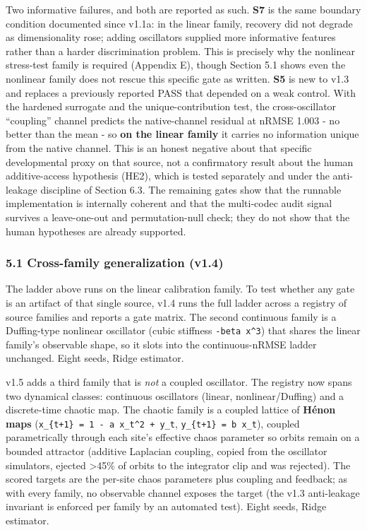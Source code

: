 \documentclass[
  11pt,
]{article}
\begin{document}
Two informative failures, and both are reported
as such. \textbf{S7} is the same boundary
condition documented since v1.1a: in the linear
family, recovery did not degrade as
dimensionality rose; adding oscillators supplied
more informative features rather than a harder
discrimination problem. This is precisely why
the nonlinear stress-test family is required
(Appendix E), though Section 5.1 shows even the
nonlinear family does not rescue this specific
gate as written. \textbf{S5} is new to v1.3 and
replaces a previously reported PASS that
depended on a weak control. With the hardened
surrogate and the unique-contribution test, the
cross-oscillator ``coupling'' channel predicts
the native-channel residual at nRMSE 1.003 - no
better than the mean - so \textbf{on the linear
family} it carries no information unique from
the native channel. This is an honest negative
about that specific developmental proxy on that
source, not a confirmatory result about the
human additive-access hypothesis (HE2), which is
tested separately and under the anti-leakage
discipline of Section 6.3. The remaining gates
show that the runnable implementation is
internally coherent and that the multi-codec
audit signal survives a leave-one-out and
permutation-null check; they do not show that
the human hypotheses are already supported.

\subsubsection{5.1 Cross-family generalization
(v1.4)}\label{cross-family-generalization-v1.4}

The ladder above runs on the linear calibration
family. To test whether any gate is an artifact
of that single source, v1.4 runs the full ladder
across a registry of source families and reports
a gate matrix. The second continuous family is a
Duffing-type nonlinear oscillator (cubic
stiffness \texttt{-beta\ x\^{}3}) that shares
the linear family's observable shape, so it
slots into the continuous-nRMSE ladder
unchanged. Eight seeds, Ridge estimator.

v1.5 adds a third family that is \emph{not} a
coupled oscillator. The registry now spans two
dynamical classes: continuous oscillators
(linear, nonlinear/Duffing) and a discrete-time
chaotic map. The chaotic family is a coupled
lattice of \textbf{Hénon maps}
(\texttt{x\_\{t+1\}\ =\ 1\ -\ a\ x\_t\^{}2\ +\ y\_t},
\texttt{y\_\{t+1\}\ =\ b\ x\_t}), coupled
parametrically through each site's effective
chaos parameter so orbits remain on a bounded
attractor (additive Laplacian coupling, copied
from the oscillator simulators, ejected
\textgreater45\% of orbits to the integrator
clip and was rejected). The scored targets are
the per-site chaos parameters plus coupling and
feedback; as with every family, no observable
channel exposes the target (the v1.3
anti-leakage invariant is enforced per family by
an automated test). Eight seeds, Ridge
estimator.
\end{document}
